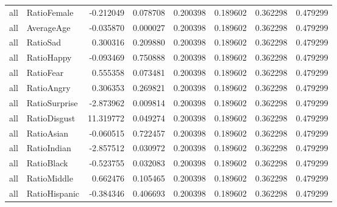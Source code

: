 \begin{tabular}{llrrrrrr}
all & RatioFemale & -0.212049 & 0.078708 & 0.200398 & 0.189602 & 0.362298 & 0.479299 \\
all & AverageAge & -0.035870 & 0.000027 & 0.200398 & 0.189602 & 0.362298 & 0.479299 \\
all & RatioSad & 0.300316 & 0.209880 & 0.200398 & 0.189602 & 0.362298 & 0.479299 \\
all & RatioHappy & -0.093469 & 0.750888 & 0.200398 & 0.189602 & 0.362298 & 0.479299 \\
all & RatioFear & 0.555358 & 0.073481 & 0.200398 & 0.189602 & 0.362298 & 0.479299 \\
all & RatioAngry & 0.306353 & 0.269821 & 0.200398 & 0.189602 & 0.362298 & 0.479299 \\
all & RatioSurprise & -2.873962 & 0.009814 & 0.200398 & 0.189602 & 0.362298 & 0.479299 \\
all & RatioDisgust & 11.319772 & 0.049274 & 0.200398 & 0.189602 & 0.362298 & 0.479299 \\
all & RatioAsian & -0.060515 & 0.722457 & 0.200398 & 0.189602 & 0.362298 & 0.479299 \\
all & RatioIndian & -2.857512 & 0.030972 & 0.200398 & 0.189602 & 0.362298 & 0.479299 \\
all & RatioBlack & -0.523755 & 0.032083 & 0.200398 & 0.189602 & 0.362298 & 0.479299 \\
all & RatioMiddle & 0.662476 & 0.105465 & 0.200398 & 0.189602 & 0.362298 & 0.479299 \\
all & RatioHispanic & -0.384346 & 0.406693 & 0.200398 & 0.189602 & 0.362298 & 0.479299 \\
\bottomrule
\end{tabular}
